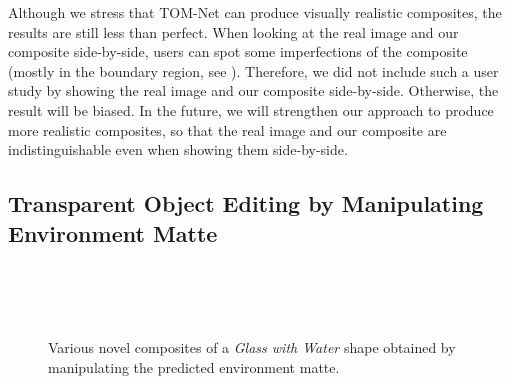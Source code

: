 Although we stress that TOM-Net can produce visually realistic composites, the results are still less than perfect. When looking at the real image and our composite side-by-side, users can spot some imperfections of the composite (mostly in the boundary region, see ). Therefore, we did not include such a user study by showing the real image and our composite side-by-side. Otherwise, the result will be biased. In the future, we will strengthen our approach to produce more realistic composites, so that the real image and our composite are indistinguishable even when showing them side-by-side.

\subsection{Transparent Object Editing by Manipulating Environment Matte}
\label{sec:edit_flow}

\begin{figure}[htbp] \centering
    \\
    
    \\
    
    \vspace{-0.2em}
    \\
    \vspace{0.4em}
     
    \caption[Image editing by manipulating the predicted environment matte]{Various novel composites of a \emph{Glass with Water} shape obtained by manipulating the predicted environment matte.} \label{fig:sup_edit}
\end{figure}

